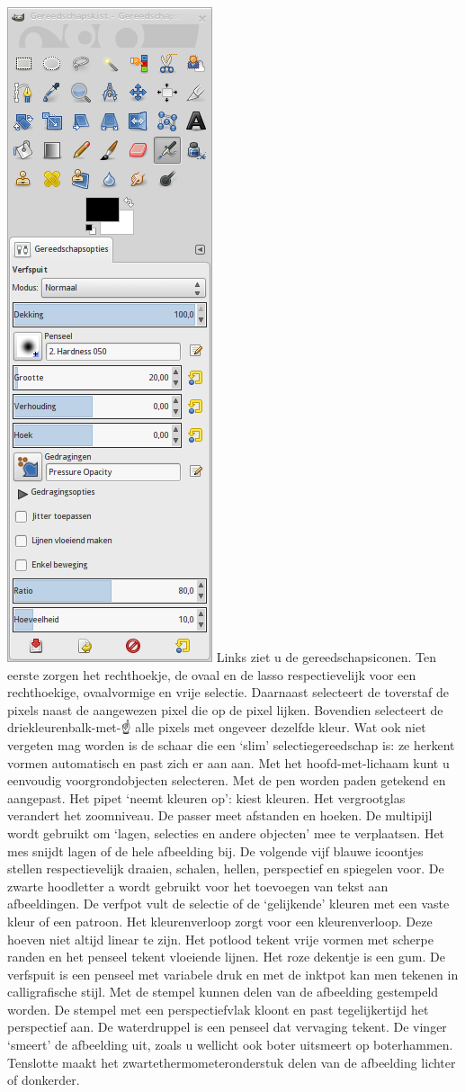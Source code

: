 \documentclass[11pt,a5paper,twoside]{book}
\begin{document}
  \includegraphics[height=\linewidth,angle=90]{gui/gereedschapskist.png}
  Links ziet u de gereedschapsiconen.
  Ten eerste zorgen het rechthoekje, de ovaal en de lasso respectievelijk
   voor een rechthoekige, ovaalvormige en vrije selectie. Daarnaast
   selecteert de toverstaf de pixels naast de aangewezen pixel die op
   de pixel lijken. Bovendien selecteert de driekleurenbalk-met-☝ alle
   pixels met ongeveer dezelfde kleur. Wat ook niet vergeten mag worden
   is de schaar die een ‘slim’ selectiegereedschap is: ze herkent
   vormen automatisch en past zich er aan aan. Met het hoofd-met-lichaam
   kunt u eenvoudig voorgrondobjecten selecteren. Met de pen worden
   paden getekend en aangepast. Het pipet
   ‘neemt kleuren op’: kiest kleuren. Het vergrootglas verandert het
   zoomniveau. De passer meet afstanden en hoeken. De multipijl wordt
   gebruikt om ‘lagen, selecties en andere objecten’ mee te verplaatsen.
  Het mes snijdt lagen of de hele afbeelding bij. De volgende vijf
   blauwe icoontjes stellen respectievelijk draaien, schalen, hellen,
   perspectief en spiegelen voor. De zwarte hoodletter a wordt gebruikt
   voor het toevoegen van tekst aan afbeeldingen. De verfpot vult de
   selectie of de ‘gelijkende’ kleuren met een vaste kleur of een patroon.
  Het kleurenverloop zorgt voor een kleurenverloop.
  Deze hoeven niet altijd linear te zijn. Het potlood tekent vrije vormen
   met scherpe randen en het penseel tekent vloeiende lijnen. Het roze
   dekentje is een gum. De verfspuit is een penseel met variabele druk en
   met de inktpot kan men tekenen in calligrafische stijl. Met de stempel
   kunnen delen van de afbeelding gestempeld worden. De stempel met een
   perspectiefvlak kloont en past tegelijkertijd het perspectief aan.
  De waterdruppel is een penseel dat vervaging tekent. De vinger ‘smeert’
   de afbeelding uit, zoals u wellicht ook boter uitsmeert op boterhammen.
  Tenslotte maakt het zwartethermometeronderstuk delen van de
   afbeelding lichter of donkerder.
\end{document}
